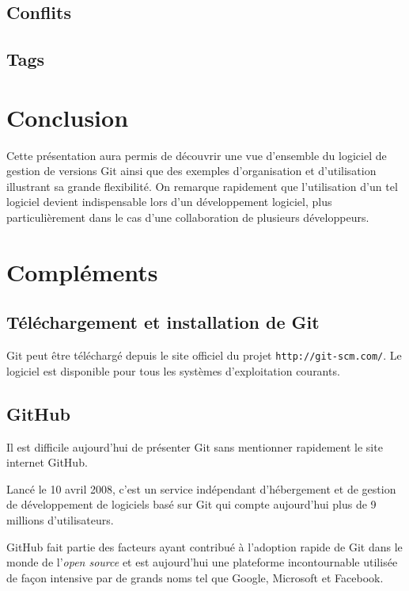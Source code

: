 \documentclass[11pt,a4paper]{article}
\begin{document}
\subsection{Conflits}

\subsection{Tags}

\section{Conclusion}

Cette présentation aura permis de découvrir une vue d'ensemble du logiciel de gestion de versions Git ainsi que des exemples d'organisation et d'utilisation illustrant sa grande flexibilité. On remarque rapidement que l'utilisation d'un tel logiciel devient indispensable lors d'un développement logiciel, plus particulièrement dans le cas d'une collaboration de plusieurs développeurs.

\pagebreak
{}
\section{Compléments}

\subsection{Téléchargement et installation de Git}

Git peut être téléchargé depuis le site officiel du projet {\tt http://git-scm.com/}.
Le logiciel est disponible pour tous les systèmes d'exploitation courants.

\subsection{GitHub}

Il est difficile aujourd'hui de présenter Git sans mentionner rapidement le site internet GitHub.

Lancé le 10 avril 2008, c'est un service indépendant d'hébergement et de gestion de développement de logiciels basé sur Git qui compte aujourd'hui plus de 9 millions d'utilisateurs.

GitHub fait partie des facteurs ayant contribué à l'adoption rapide de Git dans le monde de l'\textit{open source} et est aujourd'hui une plateforme incontournable utilisée de façon intensive par de grands noms tel que Google, Microsoft et Facebook. 
\end{document}
